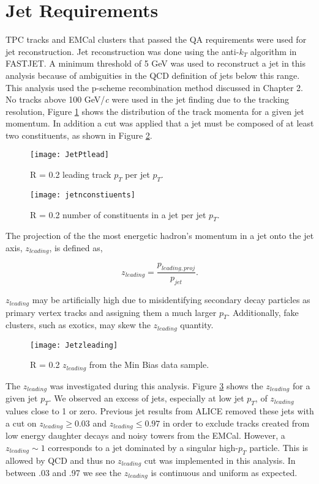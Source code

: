 \section{Jet Requirements}

TPC tracks and EMCal clusters that passed the QA requirements were used for jet reconstruction. Jet reconstruction was done using the anti-$k_{T}$ algorithm in FASTJET.  A minimum threshold of 5 GeV was used to reconstruct a jet in this analysis because of ambiguities in the QCD definition of jets below this range.  This analysis used the p-scheme recombination method discussed in Chapter 2. No tracks above 100 GeV/\textit{c} were used in the jet finding due to the tracking resolution, Figure \ref{fig:JetPt} shows the distribution of the track momenta for a given jet momentum.  In addition a cut was applied that a jet must be composed of at least two constituents, as shown in Figure \ref{fig:JetConst}.


\begin{figure}
\texttt{[image: JetPtlead]}
\centering
\caption{R = 0.2 leading track $p_{T}$ per jet $p_{T}$.}
\label{fig:JetPt}
\end{figure}

\begin{figure}
\texttt{[image: jetnconstiuents]}
\centering
\caption{R = 0.2 number of constituents in a jet per jet $p_{T}$.}
\label{fig:JetConst}
\end{figure}


The projection of the the most energetic hadron's momentum in a jet onto the jet axis, $z_{leading}$, is defined as,

\begin{equation}
z_{leading} = \frac{ p_{leading, proj} }{ p_{jet} }.
\label{eq:zleading}
\end{equation}

\noindent
$z_{leading}$ may be artificially high due to misidentifying secondary decay particles as primary vertex tracks and assigning them a much larger $p_{T}$.  Additionally, fake clusters, such as exotics, may skew the $z_{leading}$ quantity.  

\begin{figure}[h]
\texttt{[image: Jetzleading]}
\centering
\caption{R = 0.2 $z_{leading}$ from the Min Bias data sample.}
\label{fig:Jetz}
\end{figure}

The $z_{leading}$ was investigated during this analysis. Figure \ref{fig:Jetz} shows the $z_{leading}$ for a given jet $p_{T}$.  We observed an excess of jets, especially at low jet $p_{T}$, of $z_{leading}$ values close to 1 or zero.  Previous jet results from ALICE removed these jets with a cut on $ z_{leading} \geq 0.03$ and $z_{leading} \leq 0.97$ in order to exclude tracks created from low energy daughter decays and noisy towers from the EMCal.  However, a $z_{leading} \sim 1$ corresponds to a jet dominated by a singular high-$p_{T}$ particle.  This is allowed by QCD and thus no $z_{leading}$ cut was implemented in this analysis.  In between .03 and .97 we see the $z_{leading}$ is continuous and uniform as expected.  

